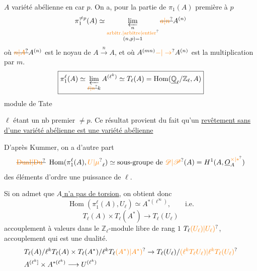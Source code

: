 $A$ variété abélienne en car $p$. On a, pour la partie de $\pi_1(A)$ première à $p$
\[
\pi_1^{\ne p}(A)\simeq\varprojlim_{\substack{n\\\text{\unsure{arbitr.|arbitre|entier}}\\(n,p)=1}}
\deleted{\unsure{a|n}}A^{(n)}
\]
où $\deleted{\unsure{n|A}}A^{(n)}$ est le noyau de $A\xrightarrow{n}A$, et où $A^{(mn)}\unsure{-|\to} A^{(n)}$ est la multiplication par $m$.
\[
\boxed{\pi_1^\ell(A)\simeq\varprojlim_{\deleted{\unsure{\ell|n}}k}A^{(\ell^k)}
\simeq T_\ell(A)=\operatorname{Hom}(\underline{\mathbb Q}_\ell/\mathbb Z_\ell,A)}
\]
module de Tate

$\ell$ étant un nb premier $\ne p$. Ce résultat provient du fait qu'un \uline{revêtement sans  d'une variété abélienne est une variété abélienne}

D'après Kummer, on a d'autre part
\[
\deleted{\unsure{\mathrm{Dual}|\mathrm{Du}}}\ \operatorname{Hom}(\pi_1^\ell(A),\unsure{U|\mu}_\ell)\simeq
\text{sous-groupe de }\unsure{\mathscr D|\mathscr P}(A)=H^1(A,\underline O_A^{\unsure{\times|*}})
\]
des éléments d'ordre une puissance de $\ell$.

Si on admet que \uline{$A$ n'a pas de torsion}, on obtient donc
\[
\operatorname{Hom}(\pi_1^\ell(A),U_\ell)\simeq A^{*(\ell^\infty)},\qquad\text{i.e.}
\]
\[
\boxed{T_\ell(A)\times T_\ell(A^*)\longrightarrow T_\ell(U_\ell)}
\]
accouplement à valeurs dans le $\mathbb Z_\ell$-module libre de rang $1$ $T_\ell\unsure{(U_\ell)|U_\ell)}$,  accouplement qui est une dualité.
\[
\begin{aligned}
&T_\ell(A)/\ell^kT_\ell(A)\times T_\ell(A^*)/\ell^kT_\ell\unsure{(A^*)|A^*)}
\to T_\ell(U_\ell)/\unsure{(\ell^kT_\ell U_\ell)|\ell^kT_\ell(U_\ell)}\\
&A^{(\ell^k]}\times A^{*(\ell^k)}\longrightarrow U^{(\ell^k)}
\end{aligned}
\]
